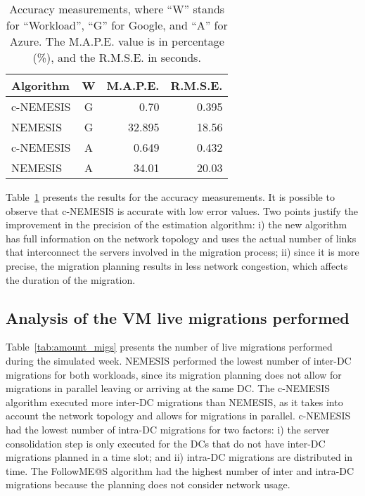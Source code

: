 \begin{table}[!htpb]
  \caption{Accuracy measurements, where ``W'' stands for ``Workload'', ``G'' for Google, and ``A'' for Azure. The M.A.P.E. value is in percentage (\%), and the R.M.S.E. in seconds. }\label{tab:accuracy} \centering
\begin{tabular}{|l|c|r|r|}
  \hline
  \textbf{Algorithm} & \textbf{W}  & \textbf{M.A.P.E.} & \textbf{R.M.S.E.}\\
  \hline
  c-NEMESIS  & G & 0.70  & 0.395 \\
  \hline
  NEMESIS & G & 32.895 & 18.56 \\
  \hline
  c-NEMESIS  & A & 0.649  & 0.432 \\
  \hline
  NEMESIS & A & 34.01 & 20.03 \\
  \hline
\end{tabular}
\end{table}



Table~\ref{tab:accuracy} presents the results for the accuracy measurements. It is possible to observe that c-NEMESIS is accurate with low error values. Two points justify the improvement in the precision of the estimation algorithm: i) the new algorithm has full information on the network topology and uses the actual number of links that interconnect the servers involved in the migration process; ii) since it is more precise, the migration planning results in less network congestion, which affects the duration of the migration.


\subsection{Analysis of the VM live migrations performed}


Table~\ref{tab:amount_migs} presents the number of live migrations performed during the simulated week. NEMESIS performed the lowest number of inter-DC migrations for both workloads, since its migration planning does not allow for migrations in parallel leaving or arriving at the same DC. The c-NEMESIS algorithm executed more inter-DC migrations than NEMESIS, as it takes into account the network topology and allows for migrations in parallel. c-NEMESIS had the lowest number of intra-DC migrations for two factors: i) the server consolidation step is only executed for the DCs that do not have inter-DC migrations planned in a time slot; and ii) intra-DC migrations are distributed in time. The FollowME@S algorithm had the highest number of inter and intra-DC migrations because the planning does not consider network usage.

